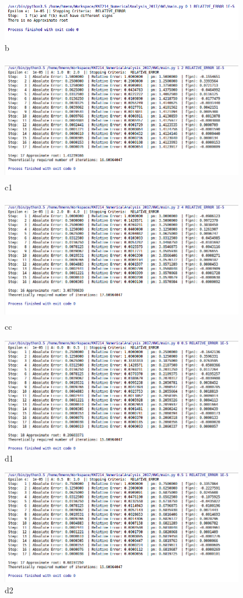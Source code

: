 \documentclass{article}
\begin{document}
\begin{figure}[h]
       \includegraphics[width=400px]{ss_2_2_6_b.png}
       \caption{b}
\end{figure}
\begin{figure}[h]
       \includegraphics[width=400px,height=200px]{ss_2_2_6_c_1.png}
       \caption{c1}
\end{figure}
\begin{figure}[h]
       \includegraphics[width=400px,height=200px]{ss_2_2_6_c_2.png}
       \caption{cc}
\end{figure}
\newpage
\begin{figure}[h]
       \includegraphics[width=400px]{ss_2_2_6_d_1.png}
       \caption{d1}
\end{figure}
\begin{figure}[h]
       \includegraphics[width=400px]{ss_2_2_6_d_2.png}
       \caption{d2}
\end{figure}
\newpage
\end{document}
